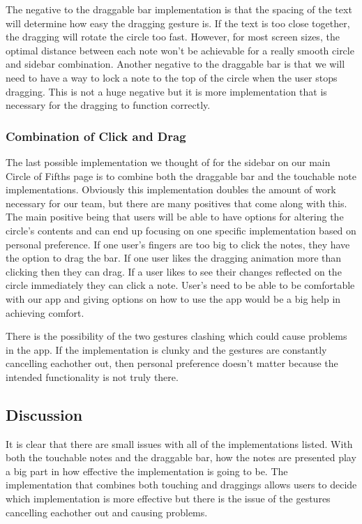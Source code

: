 \documentclass[onecolumn, draftclsnofoot,10pt, compsoc]{IEEEtran}
\begin{document}
The negative to the draggable bar implementation is that the spacing of the text will determine how easy the dragging gesture is.
If the text is too close together, the dragging will rotate the circle too fast.
However, for most screen sizes, the optimal distance between each note won't be achievable for a really smooth circle and sidebar combination.
Another negative to the draggable bar is that we will need to have a way to lock a note to the top of the circle when the user stops dragging.
This is not a huge negative but it is more implementation that is necessary for the dragging to function correctly.

\subsubsection{Combination of Click and Drag}

The last possible implementation we thought of for the sidebar on our main Circle of Fifths page is to combine both the draggable bar and the touchable note implementations.
Obviously this implementation doubles the amount of work necessary for our team, but there are many positives that come along with this.
The main positive being that users will be able to have options for altering the circle's contents and can end up focusing on one specific implementation based on personal preference.
If one user's fingers are too big to click the notes, they have the option to drag the bar.
If one user likes the dragging animation more than clicking then they can drag.
If a user likes to see their changes reflected on the circle immediately they can click a note.
User's need to be able to be comfortable with our app and giving options on how to use the app would be a big help in achieving comfort.

There is the possibility of the two gestures clashing which could cause problems in the app.
If the implementation is clunky and the gestures are constantly cancelling eachother out, then personal preference doesn't matter because the intended functionality is not truly there.

\subsection{Discussion}

It is clear that there are small issues with all of the implementations listed.
With both the touchable notes and the draggable bar, how the notes are presented play a big part in how effective the implementation is going to be.
The implementation that combines both touching and draggings allows users to decide which implementation is more effective but there is the issue of the gestures cancelling eachother out and causing problems.
\end{document}
